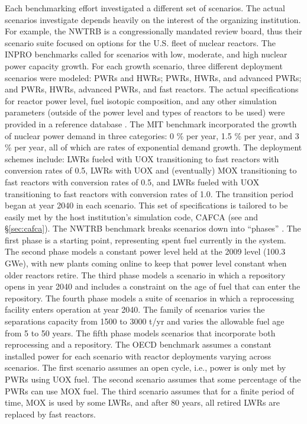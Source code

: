 Each benchmarking effort investigated a different set of scenarios. The actual
scenarios investigate depends heavily on the interest of the organizing
institution. For example, the NWTRB is a congressionally mandated review board,
thus their scenario suite focused on options for the U.S. fleet of nuclear
reactors. The INPRO benchmarks called for scenarios with low, moderate, and high
nuclear power capacity growth. For each growth scenario, three different
deployment scenarios were modeled: PWRs and HWRs; PWRs, HWRs, and advanced PWRs;
and PWRs, HWRs, advanced PWRs, and fast reactors. The actual specifications for
reactor power level, fuel isotopic composition, and any other simulation
parameters (outside of the power level and types of reactors to be used) were
provided in a reference database \cite{_international_2009}. The MIT benchmark
incorporated the growth of nuclear power demand in three categories: 0 \% per
year, 1.5 \% per year, and 3 \% per year, all of which are rates of exponential
demand growth. The deployment schemes include: LWRs fueled with UOX
transitioning to fast reactors with conversion rates of 0.5, LWRs with UOX and
(eventually) MOX transitioning to fast reactors with conversion rates of 0.5,
and LWRs fueled with UOX transitioning to fast reactors with conversion rates of
1.0. The transition period began at year 2040 in each scenario. This set of
specifications is tailored to be easily met by the host institution's simulation
code, CAFCA (see \cite{guerin_benchmark_2009} and \S\ref{sec:cafca}). The NWTRB
benchmark breaks scenarios down into
``phases'' \cite{abkowitz_scenario_2011}. The first phase is a starting point,
representing spent fuel currently in the system. The second phase models a
constant power level held at the 2009 level (100.3 GWe), with new plants coming
online to keep that power level constant when older reactors retire. The third
phase models a scenario in which a repository opens in year 2040 and includes a
constraint on the age of fuel that can enter the repository. The fourth phase
models a suite of scenarios in which a reprocessing facility enters operation at
year 2040. The family of scenarios varies the separations capacity from 1500 to
3000 t/yr and varies the allowable fuel age from 5 to 50 years. The fifth phase
models scenarios that incorporate both reprocessing and a repository. The OECD
benchmark assumes a constant installed power for each scenario with reactor
deployments varying across scenarios. The first scenario assumes an open cycle,
i.e., power is only met by PWRs using UOX fuel. The second scenario assumes that
some percentage of the PWRs can use MOX fuel. The third scenario assumes that
for a finite period of time, MOX is used by some LWRs, and after 80 years, all
retired LWRs are replaced by fast reactors.

